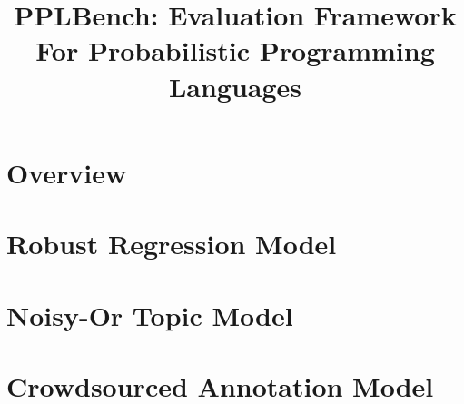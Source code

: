 \documentclass{article}
\title{PPLBench: Evaluation Framework For Probabilistic Programming Languages}
\begin{document}
\section{Overview}


\section{Robust Regression Model}


\section{Noisy-Or Topic Model}


\section{Crowdsourced Annotation Model}




\end{document}
